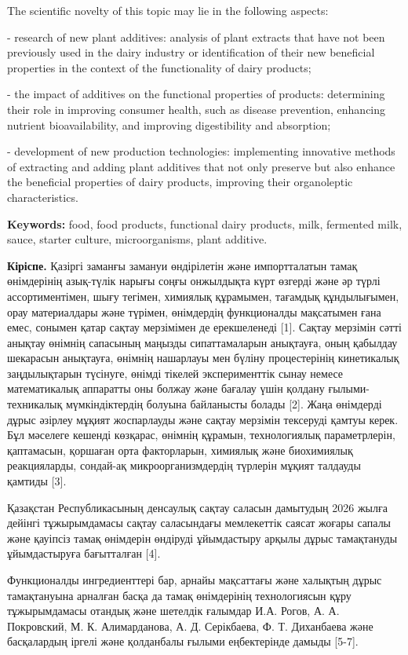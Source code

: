 {The scientific novelty of this topic may lie in the following aspects:

- research of new plant additives: analysis of plant extracts that have
not been previously used in the dairy industry or identification of
their new beneficial properties in the context of the functionality of
dairy products;

- the impact of additives on the functional properties of products:
determining their role in improving consumer health, such as disease
prevention, enhancing nutrient bioavailability, and improving
digestibility and absorption;

- development of new production technologies: implementing innovative
methods of extracting and adding plant additives that not only preserve
but also enhance the beneficial properties of dairy products, improving
their organoleptic characteristics.

{\bfseries Keywords:} food, food products, functional dairy products, milk,
fermented milk, sauce, starter culture, microorganisms, plant additive.

{\bfseries Кіріспе.} Қазіргі заманғы замануи өндірілетін және импортталатын
тамақ өнімдерінің азық-түлік нарығы соңғы онжылдықта күрт өзгерді және
әр түрлі ассортиментімен, шығу тегімен, химиялық құрамымен, тағамдық
құндылығымен, орау материалдары және түрімен, өнімдердің функционалды
мақсатымен ғана емес, сонымен қатар сақтау мерзімімен де ерекшеленеді
{[}1{]}. Сақтау мерзімін сәтті анықтау өнімнің сапасының маңызды
сипаттамаларын анықтауға, оның қабылдау шекарасын анықтауға, өнімнің
нашарлауы мен бүліну процестерінің кинетикалық заңдылықтарын түсінуге,
өнімді тікелей эксперименттік сынау немесе математикалық аппаратты оны
болжау және бағалау үшін қолдану ғылыми-техникалық мүмкіндіктердің
болуына байланысты болады {[}2{]}. Жаңа өнімдерді дұрыс әзірлеу мұқият
жоспарлауды және сақтау мерзімін тексеруді қамтуы керек. Бұл мәселеге
кешенді көзқарас, өнімнің құрамын, технологиялық параметрлерін,
қаптамасын, қоршаған орта факторларын, химиялық және биохимиялық
реакцияларды, сондай-ақ микроорганизмдердің түрлерін мұқият талдауды
қамтиды {[}3{]}.

Қазақстан Республикасының денсаулық сақтау саласын дамытудың 2026 жылға
дейінгі тұжырымдамасы сақтау саласындағы мемлекеттік саясат жоғары
сапалы және қауіпсіз тамақ өнімдерін өндіруді ұйымдастыру арқылы дұрыс
тамақтануды ұйымдастыруға бағытталған {[}4{]}.

Функционалды ингредиенттері бар, арнайы мақсаттағы және халықтың дұрыс
тамақтануына арналған басқа да тамақ өнімдерінің технологиясын құру
тұжырымдамасы отандық және шетелдік ғалымдар И.А. Рогов, А. А.
Покровский, М. К. Алимарданова, А. Д. Серікбаева, Ф. Т. Диханбаева және
басқалардың іргелі және қолданбалы ғылыми еңбектерінде дамыды {[}5-7{]}.

}
